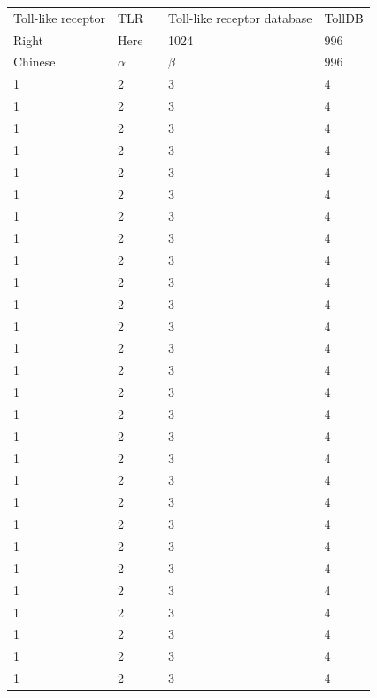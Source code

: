 \documentclass[a4paper,12pt,UTF8,openright]{book}
\begin{document}
\begin{longtable}{p{}p{}||p{}p{}p{}}
Toll-like receptor & TLR &  &Toll-like receptor database & TollDB \\
Right    & Here      && 1024 & 996 \\
Chinese  & $\alpha$  && $\beta$  & 996 \\
1 & 2 & &3 & 4 \\ 1 & 2 && 3 & 4 \\ 1 & 2 && 3 & 4 \\ 1 & 2 && 3 & 4 \\
1 & 2 && 3 & 4 \\ 1 & 2 && 3 & 4 \\ 1 & 2 && 3 & 4 \\ 1 & 2 && 3 & 4 \\
1 & 2 & &3 & 4 \\ 1 & 2 && 3 & 4 \\ 1 & 2 && 3 & 4 \\ 1 & 2 && 3 & 4 \\
1 & 2 & &3 & 4 \\ 1 & 2 && 3 & 4 \\ 1 & 2 && 3 & 4 \\ 1 & 2 && 3 & 4 \\
1 & 2& & 3 & 4 \\ 1 & 2 && 3 & 4 \\ 1 & 2 && 3 & 4 \\ 1 & 2 && 3 & 4 \\
1 & 2 && 3 & 4 \\ 1 & 2 && 3 & 4 \\ 1 & 2 && 3 & 4 \\ 1 & 2 && 3 & 4 \\
1 & 2 && 3 & 4 \\ 1 & 2 && 3 & 4 \\ 1 & 2 && 3 & 4 \\ 1 & 2 && 3 & 4 \\

\end{longtable}
\end{document}
